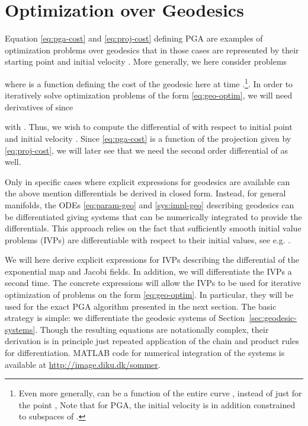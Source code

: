 \documentclass[final]{svjour3}
\begin{document}
\section{Optimization over Geodesics}
\label{sec:differentials}
Equation \eqref{eq:pga-cost} and \eqref{eq:proj-cost} defining 
PGA are examples of optimization problems over geodesics that in those cases are
represented by their starting point  and initial velocity .
More generally, we here consider problems

where  is a function defining the cost of the geodesic
 here at time .\footnote{Even more generally, 
can be a function of the entire curve ,  instead of just
for the point ,  Note that for PGA, the initial velocity is in addition
constrained to subspaces of .}. In order to iteratively solve
optimization problems of the form \eqref{eq:geo-optim}, we will need 
derivatives of  since

with . Thus, we wish to compute the differential of 
with respect to initial point  and initial velocity .
Since \eqref{eq:pga-cost} is a function of the
projection  given by \eqref{eq:proj-cost}, we will later see that we need the second 
order differential of  as well.

Only in specific cases where explicit expressions for geodesics are available
can the above mention differentials be derived in closed form. Instead, for general
manifolds, the ODEs \eqref{eq:param-geo} and \eqref{sys:impl-geo} describing geodesics 
can be differentiated giving systems that can be numerically integrated to
provide the differentials.
This approach relies on the fact that sufficiently smooth initial value problems
(IVPs) are
differentiable with respect to their initial values, see e.g. \cite[Chap.
I.14]{hairer_solving_2008}.

We will here derive explicit expressions for IVPs describing the 
differential of the exponential map and Jacobi fields. In addition, we 
will differentiate the IVPs a second time. The concrete expressions will allow
the IVPs to be used for iterative optimization of problems on the form
\eqref{eq:geo-optim}. In particular, they will be used for the
exact PGA algorithm presented in the next section. 
The basic strategy is simple: we differentiate the geodesic systems of
Section~\ref{sec:geodesic-systems}. Though the resulting equations are
notationally complex, 
their derivation is in principle just repeated application of the
chain and product rules for differentiation.
MATLAB code for numerical integration of the systems is available at
\url{http://image.diku.dk/sommer}.
\end{document}
